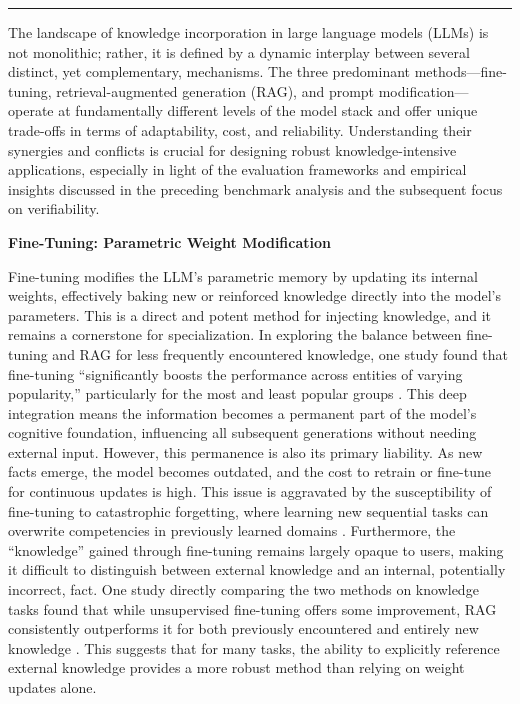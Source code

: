 \documentclass[11pt]{article}
\begin{document}
\begin{center}\rule{0.5\linewidth}{0.5pt}\end{center}

The landscape of knowledge incorporation in large language models (LLMs) is not monolithic; rather, it is defined by a dynamic interplay between several distinct, yet complementary, mechanisms. The three predominant methods---fine-tuning, retrieval-augmented generation (RAG), and prompt modification---operate at fundamentally different levels of the model stack and offer unique trade-offs in terms of adaptability, cost, and reliability. Understanding their synergies and conflicts is crucial for designing robust knowledge-intensive applications, especially in light of the evaluation frameworks and empirical insights discussed in the preceding benchmark analysis and the subsequent focus on verifiability.

\textbf{Fine-Tuning: Parametric Weight Modification}

Fine-tuning modifies the LLM's parametric memory by updating its internal weights, effectively baking new or reinforced knowledge directly into the model's parameters. This is a direct and potent method for injecting knowledge, and it remains a cornerstone for specialization. In exploring the balance between fine-tuning and RAG for less frequently encountered knowledge, one study found that fine-tuning ``significantly boosts the performance across entities of varying popularity,'' particularly for the most and least popular groups \cite{ref25}. This deep integration means the information becomes a permanent part of the model's cognitive foundation, influencing all subsequent generations without needing external input. However, this permanence is also its primary liability. As new facts emerge, the model becomes outdated, and the cost to retrain or fine-tune for continuous updates is high. This issue is aggravated by the susceptibility of fine-tuning to catastrophic forgetting, where learning new sequential tasks can overwrite competencies in previously learned domains \cite{ref422}. Furthermore, the ``knowledge'' gained through fine-tuning remains largely opaque to users, making it difficult to distinguish between external knowledge and an internal, potentially incorrect, fact. One study directly comparing the two methods on knowledge tasks found that while unsupervised fine-tuning offers some improvement, RAG consistently outperforms it for both previously encountered and entirely new knowledge \cite{ref30}. This suggests that for many tasks, the ability to explicitly reference external knowledge provides a more robust method than relying on weight updates alone.
\end{document}
